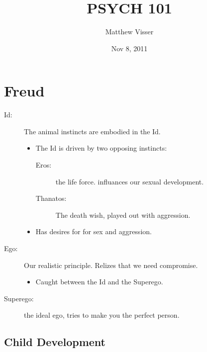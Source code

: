 \documentclass[12pt]{article}
\begin{document}
\title{PSYCH 101}
\author{Matthew Visser}
\date{Nov  8, 2011}
\maketitle

\section{Freud}

\begin{description}
	\item[Id:] The animal instincts are embodied in the Id.  
		\begin{itemize}
			\item The Id is driven by two opposing instincts:
				\begin{description}
					\item[Eros:] the life force. influances our sexual development.
					\item[Thanatos:] The death wish, played out with aggression.
				\end{description}
			\item Has desires for for sex and aggression.
		\end{itemize}
	\item[Ego:] Our realistic principle. Relizes that we need compromise.
		\begin{itemize}
			\item Caught between the Id and the Superego.
		\end{itemize}
	\item[Superego:] the ideal ego, tries to make you the perfect person.
\end{description}

\subsection{Child Development}
\end{document}
